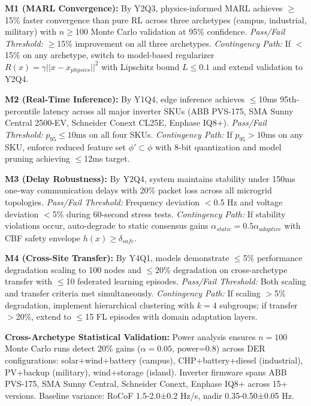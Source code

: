 \documentclass[12pt]{article}
\begin{document}
\textbf{M1 (MARL Convergence):} By Y2Q3, physics-informed MARL achieves $\geq$15\% faster convergence than pure RL across three archetypes (campus, industrial, military) with $n\geq$100 Monte Carlo validation at 95\% confidence. \textit{Pass/Fail Threshold:} $\geq$15\% improvement on all three archetypes. \textit{Contingency Path:} If $<$15\% on any archetype, switch to model-based regularizer $R(x) = \gamma||x - x_{physics}||^2$ with Lipschitz bound $L \leq 0.1$ and extend validation to Y2Q4.

\textbf{M2 (Real-Time Inference):} By Y1Q4, edge inference achieves $\leq$10ms 95th-percentile latency across all major inverter SKUs (ABB PVS-175, SMA Sunny Central 2500-EV, Schneider Conext CL25E, Enphase IQ8+). \textit{Pass/Fail Threshold:} $p_{95} \leq 10$ms on all four SKUs. \textit{Contingency Path:} If $p_{95} > 10$ms on any SKU, enforce reduced feature set $\phi' \subset \phi$ with 8-bit quantization and model pruning achieving $\leq$12ms target.

\textbf{M3 (Delay Robustness):} By Y2Q4, system maintains stability under 150ms one-way communication delays with 20\% packet loss across all microgrid topologies. \textit{Pass/Fail Threshold:} Frequency deviation $<$0.5 Hz and voltage deviation $<$5\% during 60-second stress tests. \textit{Contingency Path:} If stability violations occur, auto-degrade to static consensus gains $\alpha_{static} = 0.5\alpha_{adaptive}$ with CBF safety envelope $h(x) \geq \delta_{safe}$.

\textbf{M4 (Cross-Site Transfer):} By Y4Q1, models demonstrate $\leq$5\% performance degradation scaling to 100 nodes and $\leq$20\% degradation on cross-archetype transfer with $\leq$10 federated learning episodes. \textit{Pass/Fail Threshold:} Both scaling and transfer criteria met simultaneously. \textit{Contingency Path:} If scaling $>$5\% degradation, implement hierarchical clustering with $k=4$ subgroups; if transfer $>$20\%, extend to $\leq$15 FL episodes with domain adaptation layers.

\textbf{Cross-Archetype Statistical Validation:} Power analysis ensures $n=100$ Monte Carlo runs detect 20\% gains ($\alpha=0.05$, power=0.8) across DER configurations: solar+wind+battery (campus), CHP+battery+diesel (industrial), PV+backup (military), wind+storage (island). Inverter firmware spans ABB PVS-175, SMA Sunny Central, Schneider Conext, Enphase IQ8+ across 15+ versions. Baseline variance: RoCoF 1.5-2.0±0.2 Hz/s, nadir 0.35-0.50±0.05 Hz.
\end{document}
